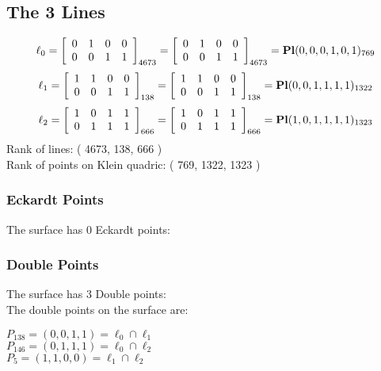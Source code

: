 \documentclass{article}
\begin{document}
{\subsection*{The 3 Lines}
$$
\ell_{0} = 
\left[
\begin{array}{*{4}{r}}
0 & 1 & 0 & 0\\
0 & 0 & 1 & 1\\
\end{array}
\right]
_{4673}
=
\left[
\begin{array}{*{4}c}
0  & 1  & 0  & 0\\
0  & 0  & 1  & 1\\
\end{array}
\right]_{4673}
={\rm\bf Pl}(0,0,0,1,0,1 )_{769}$$
$$
\ell_{1} = 
\left[
\begin{array}{*{4}{r}}
1 & 1 & 0 & 0\\
0 & 0 & 1 & 1\\
\end{array}
\right]
_{138}
=
\left[
\begin{array}{*{4}c}
1  & 1  & 0  & 0\\
0  & 0  & 1  & 1\\
\end{array}
\right]_{138}
={\rm\bf Pl}(0,0,1,1,1,1 )_{1322}$$
$$
\ell_{2} = 
\left[
\begin{array}{*{4}{r}}
1 & 0 & 1 & 1\\
0 & 1 & 1 & 1\\
\end{array}
\right]
_{666}
=
\left[
\begin{array}{*{4}c}
1  & 0  & 1  & 1\\
0  & 1  & 1  & 1\\
\end{array}
\right]_{666}
={\rm\bf Pl}(1,0,1,1,1,1 )_{1323}$$
Rank of lines: ( 4673, 138, 666 )\\
Rank of points on Klein quadric: ( 769, 1322, 1323 )\\
\subsubsection*{Eckardt Points}
The surface has 0 Eckardt points:\\
\subsubsection*{Double Points}
The surface has 3 Double points:\\
The double points on the surface are:\\
\begin{multicols}{2}
\noindent
$P_{138} = ( 0, 0, 1, 1 ) = \ell_{0} \cap \ell_{1} $\\
$P_{146} = ( 0, 1, 1, 1 ) = \ell_{0} \cap \ell_{2} $\\
$P_{5} = ( 1, 1, 0, 0 ) = \ell_{1} \cap \ell_{2} $\\
\end{multicols}
}
\end{document}
